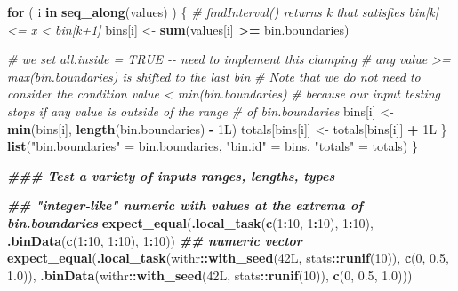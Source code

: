 \documentclass[
]{book}
\newenvironment{Shaded}{\begin{snugshade}}{\end{snugshade}}
\newcommand{\CommentTok}[1]{\textcolor[rgb]{0.56,0.35,0.01}{\textit{#1}}}
\newcommand{\ControlFlowTok}[1]{\textcolor[rgb]{0.13,0.29,0.53}{\textbf{#1}}}
\newcommand{\DecValTok}[1]{\textcolor[rgb]{0.00,0.00,0.81}{#1}}
\newcommand{\DocumentationTok}[1]{\textcolor[rgb]{0.56,0.35,0.01}{\textbf{\textit{#1}}}}
\newcommand{\FloatTok}[1]{\textcolor[rgb]{0.00,0.00,0.81}{#1}}
\newcommand{\FunctionTok}[1]{\textcolor[rgb]{0.13,0.29,0.53}{\textbf{#1}}}
\newcommand{\NormalTok}[1]{#1}
\newcommand{\OtherTok}[1]{\textcolor[rgb]{0.56,0.35,0.01}{#1}}
\newcommand{\SpecialCharTok}[1]{\textcolor[rgb]{0.81,0.36,0.00}{\textbf{#1}}}
\newcommand{\StringTok}[1]{\textcolor[rgb]{0.31,0.60,0.02}{#1}}
\begin{document}
\begin{Shaded}
\begin{Highlighting}[]
    \ControlFlowTok{for}\NormalTok{ ( i }\ControlFlowTok{in} \FunctionTok{seq\_along}\NormalTok{(values) ) \{}
      \CommentTok{\# findInterval() returns k that satisfies bin[k] \textless{}= x \textless{} bin[k+1]}
\NormalTok{      bins[i] }\OtherTok{\textless{}{-}} \FunctionTok{sum}\NormalTok{(values[i] }\SpecialCharTok{\textgreater{}=}\NormalTok{ bin.boundaries)}
      
      \CommentTok{\# we set \textasciigrave{}all.inside = TRUE\textasciigrave{} {-}{-} need to implement this clamping}
      \CommentTok{\# any value \textgreater{}= max(bin.boundaries) is shifted to the last bin}
      \CommentTok{\# Note that we do not need to consider the condition value \textless{} min(bin.boundaries)}
      \CommentTok{\# because our input testing stops if any value is outside of the range}
      \CommentTok{\# of bin.boundaries}
\NormalTok{      bins[i] }\OtherTok{\textless{}{-}} \FunctionTok{min}\NormalTok{(bins[i], }\FunctionTok{length}\NormalTok{(bin.boundaries) }\SpecialCharTok{{-}}\NormalTok{ 1L)}
\NormalTok{      totals[bins[i]] }\OtherTok{\textless{}{-}}\NormalTok{ totals[bins[i]] }\SpecialCharTok{+}\NormalTok{ 1L}
\NormalTok{    \}}
    \FunctionTok{list}\NormalTok{(}\StringTok{"bin.boundaries"} \OtherTok{=}\NormalTok{ bin.boundaries, }
         \StringTok{"bin.id"}         \OtherTok{=}\NormalTok{ bins, }
         \StringTok{"totals"}         \OtherTok{=}\NormalTok{ totals)}
\NormalTok{  \}}
  
  \DocumentationTok{\#\#\# Test a variety of inputs ranges, lengths, types}
  
  \DocumentationTok{\#\# "integer{-}like" numeric with values at the extrema of \textasciigrave{}bin.boundaries\textasciigrave{}}
  \FunctionTok{expect\_equal}\NormalTok{(}\FunctionTok{.local\_task}\NormalTok{(}\FunctionTok{c}\NormalTok{(}\DecValTok{1}\SpecialCharTok{:}\DecValTok{10}\NormalTok{, }\DecValTok{1}\SpecialCharTok{:}\DecValTok{10}\NormalTok{), }\DecValTok{1}\SpecialCharTok{:}\DecValTok{10}\NormalTok{),}
               \FunctionTok{.binData}\NormalTok{(}\FunctionTok{c}\NormalTok{(}\DecValTok{1}\SpecialCharTok{:}\DecValTok{10}\NormalTok{, }\DecValTok{1}\SpecialCharTok{:}\DecValTok{10}\NormalTok{), }\DecValTok{1}\SpecialCharTok{:}\DecValTok{10}\NormalTok{))}
  \DocumentationTok{\#\# numeric vector}
  \FunctionTok{expect\_equal}\NormalTok{(}\FunctionTok{.local\_task}\NormalTok{(withr}\SpecialCharTok{::}\FunctionTok{with\_seed}\NormalTok{(42L, stats}\SpecialCharTok{::}\FunctionTok{runif}\NormalTok{(}\DecValTok{10}\NormalTok{)), }
                           \FunctionTok{c}\NormalTok{(}\DecValTok{0}\NormalTok{, }\FloatTok{0.5}\NormalTok{, }\FloatTok{1.0}\NormalTok{)),}
               \FunctionTok{.binData}\NormalTok{(withr}\SpecialCharTok{::}\FunctionTok{with\_seed}\NormalTok{(42L, stats}\SpecialCharTok{::}\FunctionTok{runif}\NormalTok{(}\DecValTok{10}\NormalTok{)), }
                        \FunctionTok{c}\NormalTok{(}\DecValTok{0}\NormalTok{, }\FloatTok{0.5}\NormalTok{, }\FloatTok{1.0}\NormalTok{)))}
  

\end{Highlighting}
\end{Shaded}
\end{document}
